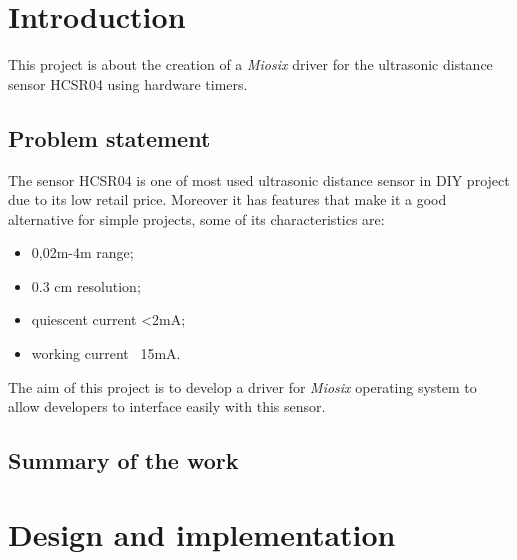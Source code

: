 \section{Introduction}
This project is about the creation of a \textit{Miosix} driver for the ultrasonic distance sensor HCSR04 using hardware timers. 
\subsection{Problem statement}
The sensor HCSR04 is one of most used ultrasonic distance sensor in DIY project due to its low retail price. Moreover it has features that make it a good alternative for simple projects, some of its characteristics are:
\begin{itemize}
\item 0,02m-4m range;
\item 0.3 cm resolution;
\item quiescent current <2mA;
\item working current ~15mA.
\end{itemize}  
The aim of this project is to develop a driver for \textit{Miosix} operating system to allow developers to interface easily with this sensor.
\subsection{Summary of the work}

\pagebreak

\section{Design and implementation}
